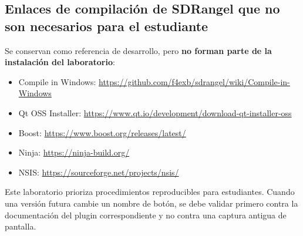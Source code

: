 \subsection*{Enlaces de compilación de SDRangel que no son necesarios para el estudiante}

Se conservan como referencia de desarrollo, pero \textbf{no forman parte de la instalación del laboratorio}:

\begin{itemize}
    \item Compile in Windows: \url{https://github.com/f4exb/sdrangel/wiki/Compile-in-Windows}
    \item Qt OSS Installer: \url{https://www.qt.io/development/download-qt-installer-oss}
    \item Boost: \url{https://www.boost.org/releases/latest/}
    \item Ninja: \url{https://ninja-build.org/}
    \item NSIS: \url{https://sourceforge.net/projects/nsis/}
\end{itemize}

\begin{nota}
Este laboratorio prioriza procedimientos reproducibles para estudiantes. Cuando una versión futura cambie un nombre de botón, se debe validar primero contra la documentación del plugin correspondiente y no contra una captura antigua de pantalla.
\end{nota}